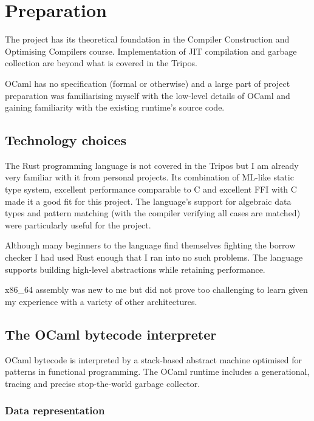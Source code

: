 \chapter{Preparation}

The project has its theoretical foundation in the Compiler Construction and Optimising Compilers
course. Implementation of JIT compilation and garbage collection are beyond what is covered in the
Tripos.

OCaml has no specification (formal or otherwise) and a large part of project preparation was
familiarising myself with the low-level details of OCaml and gaining familiarity with the existing
runtime's source code.

\section{Technology choices}

The Rust programming language is not covered in the Tripos but I am already very familiar with
it from personal projects. Its combination of ML-like static type system, excellent performance
comparable to C and excellent FFI with C made it a good fit for this project. The language's
support
for algebraic data types and pattern matching (with the compiler verifying all cases are matched)
were particularly useful for the project.

Although many beginners to the language find themselves fighting the borrow checker I had used Rust
enough that I ran into no such problems. The language supports building high-level abstractions
while retaining performance.

x86\_64 assembly was new to me but did not prove too challenging to learn given my experience with
a variety of other architectures.

\section{The OCaml bytecode interpreter}

OCaml bytecode is interpreted by a stack-based abstract machine optimised for patterns in
functional programming. The OCaml runtime includes a generational, tracing and precise
stop-the-world garbage collector.

\subsection{Data representation}

